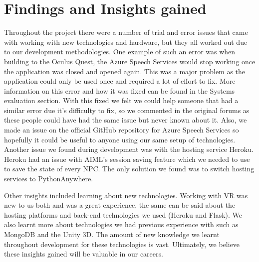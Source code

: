 \section{Findings and Insights gained}

Throughout the project there were a number of trial and error issues that came with working with new technologies and hardware, but they all worked out due to our development methodologies. One example of such an error was when building to the Oculus Quest, the Azure Speech Services would stop working once the application was closed and opened again. This was a major problem as the application could only be used once and required a lot of effort to fix. More information on this error and how it was fixed can be found in the Systems evaluation section. With this fixed we felt we could help someone that had a similar error due it's difficulty to fix, so we commented in the original forums as these people could have had the same issue but never known about it. Also, we made an issue on the official GitHub repository for Azure Speech Services so hopefully it could be useful to anyone using our same setup of technologies. Another issue we found during development was with the hosting service Heroku. Heroku had an issue with AIML's session saving feature which we needed to use to save the state of every NPC. The only solution we found was to switch hosting services to PythonAnywhere.

\par
\medskip
Other insights included learning about new technologies. Working with VR was new to us both and was a great experience, the same can be said about the hosting platforms and back-end technologies we used (Heroku and Flask). We also learnt more about technologies we had previous experience with such as MongoDB and the Unity 3D. The amount of new knowledge we learnt throughout development for these technologies is vast. Ultimately, we believe these insights gained will be valuable in our careers.

